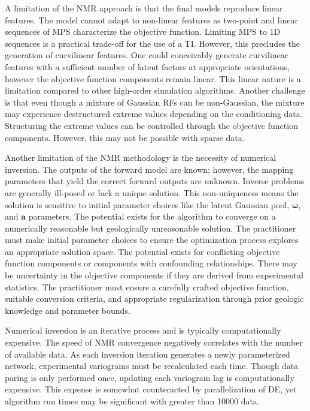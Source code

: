 A limitation of the \gls{NMR} approach is that the final models reproduce linear features. The model cannot adapt to non-linear features as two-point and linear sequences of \gls{MPS} characterize the objective function. Limiting \gls{MPS} to \gls{1D} sequences is a practical trade-off for the use of a \gls{TI}. However, this precludes the generation of curvilinear features. One could conceivably generate curvilinear features with a sufficient number of latent factors at appropriate orientations, however the objective function components remain linear. This linear nature is a limitation compared to other high-order simulation algorithms. Another challenge is that even though a mixture of Gaussian \glspl{RF} can be non-Gaussian, the mixture may experience destructured extreme values depending on the conditioning data. Structuring the extreme values can be controlled through the objective function components. However, this may not be possible with sparse data.

Another limitation of the \gls{NMR} methodology is the necessity of numerical inversion. The outputs of the forward model are known; however, the mapping parameters that yield the correct forward outputs are unknown. Inverse problems are generally ill-posed or lack a unique solution. This non-uniqueness means the solution is sensitive to initial parameter choices like the latent Gaussian pool, $\boldsymbol{\omega}$, and $\boldsymbol{a}$ parameters. The potential exists for the algorithm to converge on a numerically reasonable but geologically unreasonable solution. The practitioner must make initial parameter choices to ensure the optimization process explores an appropriate solution space. The potential exists for conflicting objective function components or components with confounding relationships. There may be uncertainty in the objective components if they are derived from experimental statistics. The practitioner must ensure a carefully crafted objective function, suitable conversion criteria, and appropriate regularization through prior geologic knowledge and parameter bounds.

Numerical inversion is an iterative process and is typically computationally expensive. The speed of \gls{NMR} convergence negatively correlates with the number of available data. As each inversion iteration generates a newly parameterized network, experimental variograms must be recalculated each time. Though data paring is only performed once, updating each variogram lag is computationally expensive. This expense is somewhat counteracted by parallelization of \gls{DE}, yet algorithm run times may be significant with greater than 10000 data.

